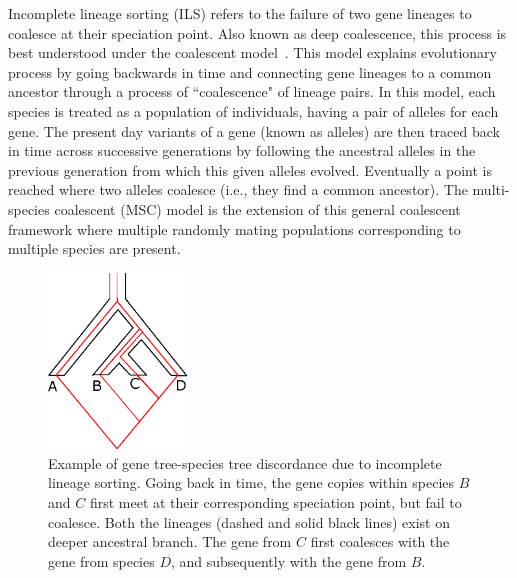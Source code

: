 
Incomplete lineage sorting (ILS) refers to the failure of two gene lineages to coalesce at their speciation point. Also known as deep coalescence, this process is best understood under the coalescent model~\cite{degnan2006discordance, degnan2005gene}. This model explains evolutionary process by going backwards in time and connecting gene lineages to a common ancestor through a process of ``coalescence" of lineage pairs. In this model, each species is treated as a population of individuals, having a pair of alleles for each gene. The present day variants of a gene (known as alleles) are then traced back in time across successive generations by following the ancestral alleles in the previous generation from which this given alleles evolved. Eventually a point is reached where two alleles coalesce (i.e., they find a common ancestor). The multi-species coalescent (MSC) model is the extension of this general coalescent framework where multiple randomly mating populations corresponding to multiple species are present.
\begin{figure}[!tb]
	\centering
	\includegraphics[width=0.33\textwidth]{Figure/ils.eps}
	\caption{Example of gene tree-species tree discordance due to incomplete lineage sorting. Going back in time, the gene copies within species $B$ and $C$ first meet at their corresponding speciation point, but fail to coalesce. Both the lineages (dashed and solid black lines) exist on deeper ancestral branch. The gene from $C$ first coalesces with the gene from species $D$, and subsequently with the gene from $B$.
	}
	\label{fig:ils}
\end{figure}

